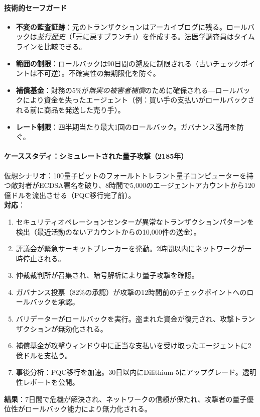 \documentclass[11pt]{article}
\begin{document}
\paragraph{技術的セーフガード}
\begin{itemize}[noitemsep]
  \item \textbf{不変の監査証跡}：元のトランザクションはアーカイブログに残る。ロールバックは\emph{並行歴史}（「元に戻すブランチ」）を作成する。法医学調査員はタイムラインを比較できる。
  \item \textbf{範囲の制限}：ロールバックは90日間の遡及に制限される（古いチェックポイントは不可逆）。不確実性の無期限化を防ぐ。
  \item \textbf{補償基金}：財務の5\%が\emph{無実の被害者補償}のために確保される—ロールバックにより資金を失ったエージェント（例：買い手の支払いがロールバックされる前に商品を発送した売り手）。
  \item \textbf{レート制限}：四半期当たり最大1回のロールバック。ガバナンス濫用を防ぐ。
\end{itemize}

\paragraph{ケーススタディ：シミュレートされた量子攻撃（2185年）}
仮想シナリオ：100量子ビットのフォールトトレラント量子コンピューターを持つ敵対者がECDSA署名を破り、8時間で5,000のエージェントアカウントから120億ドルを流出させる（PQC移行完了前）。\\
\textbf{対応}：
\begin{enumerate}[noitemsep]
  \item セキュリティオペレーションセンターが異常なトランザクションパターンを検出（最近活動のないアカウントからの10,000件の送金）。
  \item 評議会が緊急サーキットブレーカーを発動。2時間以内にネットワークが一時停止される。
  \item 仲裁裁判所が召集され、暗号解析により量子攻撃を確認。
  \item ガバナンス投票（82\%の承認）が攻撃の12時間前のチェックポイントへのロールバックを承認。
  \item バリデーターがロールバックを実行。盗まれた資金が復元され、攻撃トランザクションが無効化される。
  \item 補償基金が攻撃ウィンドウ中に正当な支払いを受け取ったエージェントに2億ドルを支払う。
  \item 事後分析：PQC移行を加速。30日以内にDilithium-5にアップグレード。透明性レポートを公開。
\end{enumerate}
\textbf{結果}：7日間で危機が解決され、ネットワークの信頼が保たれ、攻撃者の量子優位性がロールバック能力により無力化される。
\end{document}
